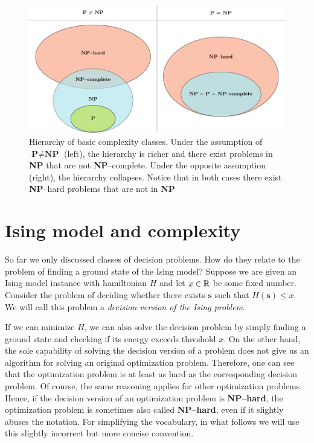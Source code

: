 \begin{figure}
    \includegraphics[width=\textwidth]{figures/complexity_new.pdf}
    \caption{Hierarchy of basic complexity classes. Under the assumption of $\textbf{P} \ne \textbf{NP}$ (left), the hierarchy is richer and there exist problems in \textbf{NP}  that are not \textbf{NP}--complete. Under the opposite assumption (right), the hierarchy collapses. Notice that in both cases there exist \textbf{NP}--hard problems that are not in \textbf{NP}
    }
    \label{fig:complexity}
\end{figure}



\section{Ising model and complexity}

So far we only discussed classes of decision problems. How do they relate to the problem of
finding a ground state of the Ising model? Suppose we are given an Ising model instance with
hamiltonian $H$ and let $x \in \mathbb{R}$ be some fixed number. Consider the problem of deciding whether
there exists $\mathbf{s}$ such that $H(\mathbf{s}) \le x$. We will call this problem a
\emph{decision version of the Ising problem}.

If we can minimize $H$, we can also solve the decision problem by simply finding a ground state and
checking if its energy exceeds threshold $x$. On the other hand, the sole capability of solving the
decision version of a problem does not give us an algorithm for solving an original optimization
problem. Therefore, one can see that the optimization problem is at least as hard as the
corresponding decision problem. Of course, the same reasoning applies for other optimization
problems. Hence, if the decision version of an optimization problem is \textbf{NP--hard},
the optimization problem is sometimes also called \textbf{NP--hard}, even if it slightly abuses the
notation. For simplifying the vocabulary, in what follows we will use this slightly
incorrect but more concise convention.

